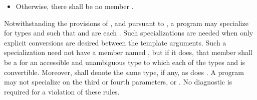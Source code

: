 \begin{addedblock}
\begin{itemize}
\begin{itemize}
  \item Otherwise, there shall be no member .
  \end{itemize}
\end{itemize}

\pnum
Notwithstanding the provisions of , and
pursuant to ,
a program may specialize 
for types  and  such that
 and
 are each .
\enternote Such specializations are needed when only explicit conversions
are desired between the template arguments. \exitnote
Such a specialization need not have a member named ,
but if it does, that member shall be a 
for an accessible and unambiguous type 
to which each of the types  and  is convertible.
Moreover,  shall denote
the same type, if any, as does .
A program may not specialize  on the third or
fourth parameters,  or . No diagnostic is required for
a violation of these rules.
\end{addedblock}
